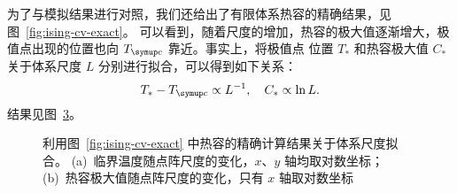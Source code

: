 为了与模拟结果进行对照，我们还给出了有限体系热容的精确结果，见图~\ref{fig:ising-cv-exact}。
可以看到，随着尺度的增加，热容的极大值逐渐增大，极值点出现的位置也向 $\Tc$ 靠近。事实上，将极值点
位置 $T_*$ 和热容极大值 $C_*$ 关于体系尺度 $L$ 分别进行拟合，可以得到如下关系：
\begin{equation}
  T_* - \Tc \propto L^{-1} \qc
  C_*       \propto \ln L.
\end{equation}
结果见图~\ref{fig:ising-fit}。

\begin{figure}
  \begin{subfigure}[b]{0.47\textwidth}
    \hfill
    \label{fig:ising-cv-fit-i}
  \end{subfigure}
  \begin{subfigure}[b]{0.47\textwidth}
    \hfill
    \label{fig:ising-cv-fit-ii}
  \end{subfigure}
  \caption{利用图~\ref{fig:ising-cv-exact} 中热容的精确计算结果关于体系尺度拟合。
    (a)~临界温度随点阵尺度的变化，$x$、$y$ 轴均取对数坐标；
    (b)~热容极大值随点阵尺度的变化，只有 $x$ 轴取对数坐标}
  \label{fig:ising-fit}
\end{figure}
